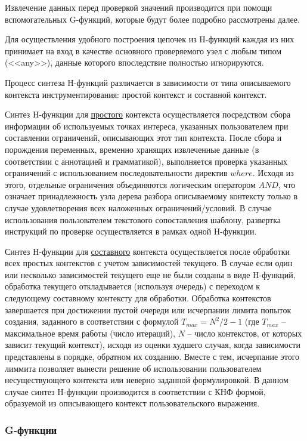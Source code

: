 Извлечение данных перед проверкой значений производится при помощи вспомогательных G-функций, которые будут более подробно рассмотрены далее.

Для осуществления удобного построения цепочек из H-функций каждая из них принимает на вход в качестве основного проверяемого узел с любым типом (<<any>>), данные которого впоследствие полностью игнорируются.

Процесс синтеза H-функций различается в зависимости от типа описываемого контекста инструментирования:
простой контекст и
составной контекст.

Синтез H-функции для \underline{простого} контекста осуществляется посредством сбора информации об используемых точках интереса, указанных пользователем при составлении ограничений, описывающих этот тип контекста.
После сбора и порождения переменных, временно хранящих извлеченные данные (в соответствии с аннотацией и грамматикой), выполняется проверка указанных ограничений с использованием последовательности директив $where$.
Исходя из этого, отдельные ограничения объединяются логическим оператором $AND$, что означает принадлежность узла дерева разбора описываемому контексту только в случае удовлетворения всех наложенных ограничений/условий.
В случае использования пользователем текстового сопоставления шаблону, развертка инструкций по проверке осуществляется в рамках одной H-функции.

Синтез H-функции для \underline{составного} контекста осуществляется после обработки всех простых контекстов с учетом зависимостей текущего.
В случае если один или несколько зависимостей текущего еще не были созданы в виде H-функций, обработка текущего откладывается (используя очередь) с переходом к следующему составному контексту для обработки.
Обработка контекстов завершается при достижении пустой очереди или исчерпании лимита попыток создания, заданного в соответствии с формулой $T_{max}=N^2/2-1$ (где $T_{max}$ -- максимальное время работы (число итераций), $N$ -- число контекстов, от которых зависит текущий контекст), исходя из оценки худшего случая, когда зависимости представлены в порядке, обратном их созданию.
Вместе с тем, исчерпание этого лиммита позволяет вынести решение об использовании пользователем несуществующего контекста или неверно заданной формулировкой.
В данном случае синтез H-функции производится в соответствии с КНФ формой, образуемой из описывающего контекст пользовательского выражения.

\subsubsection{G-функции}

